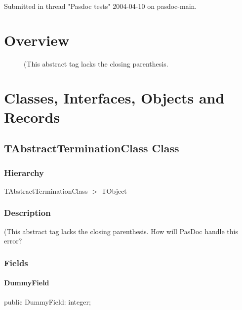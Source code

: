 \documentclass{report}
\begin{document}
Submitted in thread "Pasdoc tests" 2004{-}04{-}10 on pasdoc{-}main.
\section{Overview}
\begin{description}
\item[\texttt{\begin{ttfamily}TAbstractTerminationClass\end{ttfamily} Class}](This abstract tag lacks the closing parenthesis.
\end{description}
\section{Classes, Interfaces, Objects and Records}
\subsection*{TAbstractTerminationClass Class}
\subsubsection*{\large{\textbf{Hierarchy}}\normalsize\hspace{1ex}\hfill}
TAbstractTerminationClass {$>$} TObject
\subsubsection*{\large{\textbf{Description}}\normalsize\hspace{1ex}\hfill}
(This abstract tag lacks the closing parenthesis. How will PasDoc handle this error?\subsubsection*{\large{\textbf{Fields}}\normalsize\hspace{1ex}\hfill}
\paragraph*{DummyField}\hspace*{\fill}

\begin{list}{}{
\setlength{\itemindent}{0cm}
\setlength{\listparindent}{0cm}
\setlength{\leftmargin}{\evensidemargin}
\addtolength{\leftmargin}{\tmplength}
\settowidth{\labelsep}{X}
\addtolength{\leftmargin}{\labelsep}
\setlength{\labelwidth}{\tmplength}
}
\begin{flushleft}
\item[\textbf{Declaration}\hfill]
\begin{ttfamily}
public DummyField: integer;\end{ttfamily}


\end{flushleft}
\end{list}
\end{document}
